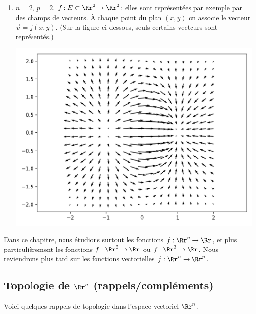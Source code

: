 \documentclass[11pt, class=report,crop=false]{standalone}
\begin{document}
\begin{exemple}
\begin{enumerate}
 

\item $n=2$, $p = 2$. $f: E \subset \Rr^2 \rightarrow \Rr^2$: elles sont représentées par exemple par des champs de vecteurs.
À chaque point du plan $(x,y)$ on associe le vecteur $\vec v = f(x,y)$. (Sur la figure ci-dessous, seuls certains vecteurs sont représentés.)

\begin{center}
    \includegraphics[scale=\myscale,scale=0.6]{figures/fonctions-intro-06}
\end{center}


\end{enumerate}
\end{exemple}


Dans ce chapitre, nous étudions surtout les fonctions $f : \Rr^n \to \Rr$, et plus particulièrement les fonctions $f : \Rr^2 \to \Rr$ ou $f : \Rr^3 \to \Rr$.
Nous reviendrons plus tard sur les fonctions vectorielles $f : \Rr^n \to \Rr^p$.

\subsection{Topologie de $\Rr^n$ (rappels/compléments)}

Voici quelques rappels de topologie dans l'espace vectoriel $\Rr^n$. 
\end{document}
